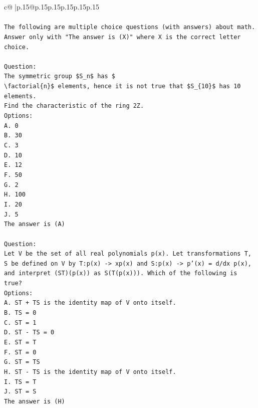 \documentclass{article}
\begin{document}
{\begin{supertabular}{c@{$\;$}|p{.15\linewidth}@{}p{.15\linewidth}p{.15\linewidth}p{.15\linewidth}p{.15\linewidth}p{.15\linewidth}}
{{{\\ 
\\ 
\texttt{The following are multiple choice questions (with answers) about math. Answer only with "The answer is (X)" where X is the correct letter choice.} \\
\\ 
\texttt{Question:} \\
\texttt{The symmetric group \$S\_n\$ has \$} \\
\texttt{\textbackslash{}factorial\{n\}\$ elements, hence it is not true that \$S\_\{10\}\$ has 10 elements.} \\
\texttt{Find the characteristic of the ring 2Z.} \\
\texttt{Options:} \\
\texttt{A. 0} \\
\texttt{B. 30} \\
\texttt{C. 3} \\
\texttt{D. 10} \\
\texttt{E. 12} \\
\texttt{F. 50} \\
\texttt{G. 2} \\
\texttt{H. 100} \\
\texttt{I. 20} \\
\texttt{J. 5} \\
\texttt{The answer is (A)} \\
\\ 
\texttt{Question:} \\
\texttt{Let V be the set of all real polynomials p(x). Let transformations T, S be defined on V by T:p(x) {-}> xp(x) and S:p(x) {-}> p'(x) = d/dx p(x), and interpret (ST)(p(x)) as S(T(p(x))). Which of the following is true?} \\
\texttt{Options:} \\
\texttt{A. ST + TS is the identity map of V onto itself.} \\
\texttt{B. TS = 0} \\
\texttt{C. ST = 1} \\
\texttt{D. ST {-} TS = 0} \\
\texttt{E. ST = T} \\
\texttt{F. ST = 0} \\
\texttt{G. ST = TS} \\
\texttt{H. ST {-} TS is the identity map of V onto itself.} \\
\texttt{I. TS = T} \\
\texttt{J. ST = S} \\
\texttt{The answer is (H)} \\
}}}
\end{supertabular}}
\end{document}
